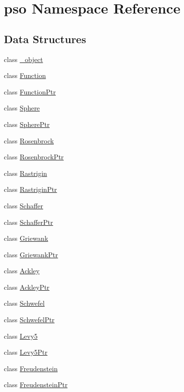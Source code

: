 \hypertarget{namespacepso}{
\section{pso Namespace Reference}
\label{namespacepso}
}


\subsection*{Data Structures}
\begin{CompactItemize}
\item 
class \hyperlink{classpso_1_1__object}{\_\-object}
\item 
class \hyperlink{classpso_1_1Function}{Function}
\item 
class \hyperlink{classpso_1_1FunctionPtr}{FunctionPtr}
\item 
class \hyperlink{classpso_1_1Sphere}{Sphere}
\item 
class \hyperlink{classpso_1_1SpherePtr}{SpherePtr}
\item 
class \hyperlink{classpso_1_1Rosenbrock}{Rosenbrock}
\item 
class \hyperlink{classpso_1_1RosenbrockPtr}{RosenbrockPtr}
\item 
class \hyperlink{classpso_1_1Rastrigin}{Rastrigin}
\item 
class \hyperlink{classpso_1_1RastriginPtr}{RastriginPtr}
\item 
class \hyperlink{classpso_1_1Schaffer}{Schaffer}
\item 
class \hyperlink{classpso_1_1SchafferPtr}{SchafferPtr}
\item 
class \hyperlink{classpso_1_1Griewank}{Griewank}
\item 
class \hyperlink{classpso_1_1GriewankPtr}{GriewankPtr}
\item 
class \hyperlink{classpso_1_1Ackley}{Ackley}
\item 
class \hyperlink{classpso_1_1AckleyPtr}{AckleyPtr}
\item 
class \hyperlink{classpso_1_1Schwefel}{Schwefel}
\item 
class \hyperlink{classpso_1_1SchwefelPtr}{SchwefelPtr}
\item 
class \hyperlink{classpso_1_1Levy5}{Levy5}
\item 
class \hyperlink{classpso_1_1Levy5Ptr}{Levy5Ptr}
\item 
class \hyperlink{classpso_1_1Freudenstein}{Freudenstein}
\item 
class \hyperlink{classpso_1_1FreudensteinPtr}{FreudensteinPtr}

\end{CompactItemize}
